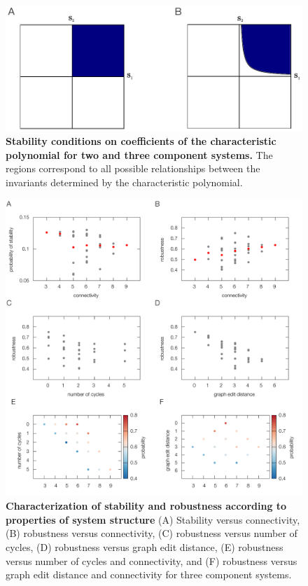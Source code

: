 \begin{figure}[!ht]
\centering
\noindent\includegraphics[width=0.8\columnwidth]{fig/region2and3.pdf}
\caption{{\bf Stability conditions on coefficients of the characteristic polynomial for two and three component systems.} The regions correspond to all possible relationships between the invariants determined by the characteristic polynomial.}
\label{fig:region2and3}
\end{figure}

\begin{figure}[!ht]
\centering
\noindent\includegraphics[width=1.0\columnwidth]{fig/combinedfigs.pdf}
\caption{{\bf Characterization of stability and robustness according to properties of system structure} (A) Stability versus connectivity, (B) robustness versus connectivity, (C) robustness versus number of cycles, (D) robustness versus graph edit distance, (E) robustness versus number of cycles and connectivity, and (F) robustness versus graph edit distance and connectivity for three component systems.}
\label{fig:combined}
\end{figure}

